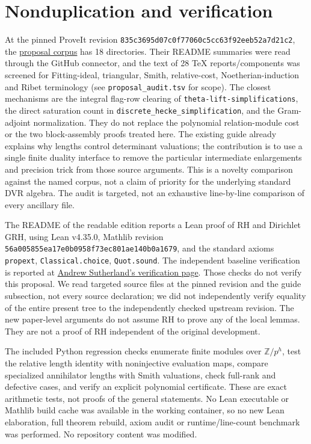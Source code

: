 \documentclass[11pt]{article}
\begin{document}
\section{Nonduplication and verification}
At the pinned ProveIt revision \texttt{835c3695d07c0f77060c5cc63f92eeb52a7d21c2}, the \href{https://github.com/VladimirReshetnikov/ProveIt/tree/835c3695d07c0f77060c5cc63f92eeb52a7d21c2/Analysis/GeneralizedRiemannHypothesis/docs/proposals}{proposal corpus} has 18 directories. Their README summaries were read through the GitHub connector, and the text of 28 TeX reports/components was screened for Fitting-ideal, triangular, Smith, relative-cost, Noetherian-induction and Ribet terminology (see \texttt{proposal\_audit.tsv} for scope). The closest mechanisms are the integral flag-row clearing of \texttt{theta-lift-simplifications}, the direct saturation count in \texttt{discrete\_hecke\_simplification}, and the Gram-adjoint normalization. They do not replace the polynomial relation-module cost or the two block-assembly proofs treated here. The existing guide already explains why lengths control determinant valuations; the contribution is to use a single finite duality interface to remove the particular intermediate enlargements and precision trick from those source arguments. This is a novelty comparison against the named corpus, not a claim of priority for the underlying standard DVR algebra. The audit is targeted, not an exhaustive line-by-line comparison of every ancillary file.

The README of the readable edition reports a Lean proof of RH and Dirichlet GRH, using Lean v4.35.0, Mathlib revision \texttt{56a005855ea17e0b0958f73ec801ae140b0a1679}, and the standard axioms \texttt{propext}, \texttt{Classical.choice}, \texttt{Quot.sound}. The independent baseline verification is reported at \href{https://math.mit.edu/~drew/shortgrh/}{Andrew Sutherland's verification page}. Those checks do not verify this proposal. We read targeted source files at the pinned revision and the guide subsection, not every source declaration; we did not independently verify equality of the entire present tree to the independently checked upstream revision. The new paper-level arguments do not assume RH to prove any of the local lemmas. They are not a proof of RH independent of the original development.

The included Python regression checks enumerate finite modules over $\mathbb Z/p^h$, test the relative length identity with noninjective evaluation maps, compare specialized annihilator lengths with Smith valuations, check full-rank and defective cases, and verify an explicit polynomial certificate. These are exact arithmetic tests, not proofs of the general statements. No Lean executable or Mathlib build cache was available in the working container, so no new Lean elaboration, full theorem rebuild, axiom audit or runtime/line-count benchmark was performed. No repository content was modified.
\end{document}
